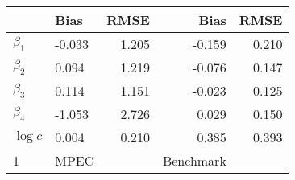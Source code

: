 
\begin{tabular}[t]{llrrr}
\toprule
  & Bias & RMSE & Bias & RMSE\\
\midrule
$\beta_{1}$ & -0.033 & 1.205 & -0.159 & 0.210\\
$\beta_{2}$ & 0.094 & 1.219 & -0.076 & 0.147\\
$\beta_{3}$ & 0.114 & 1.151 & -0.023 & 0.125\\
$\beta_{4}$ & -1.053 & 2.726 & 0.029 & 0.150\\
$\log c$ & 0.004 & 0.210 & 0.385 & 0.393\\
1 & MPEC &  & Benchmark & \\
\bottomrule
\end{tabular}
